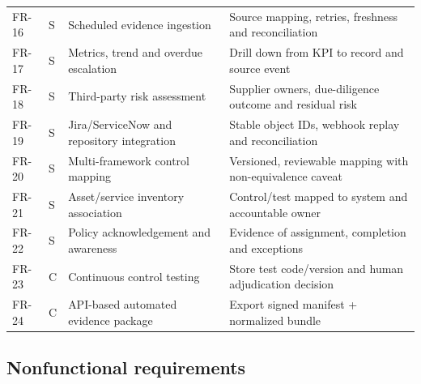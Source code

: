 \documentclass[10pt,letterpaper]{article}
\begin{document}
\begin{longtable}{@{}L{0.58in}L{0.36in}L{2.55in}L{2.87in}@{}}
FR-16 & S & Scheduled evidence ingestion & Source mapping, retries, freshness and reconciliation\\
FR-17 & S & Metrics, trend and overdue escalation & Drill down from KPI to record and source event\\
FR-18 & S & Third-party risk assessment & Supplier owners, due-diligence outcome and residual risk\\
FR-19 & S & Jira/ServiceNow and repository integration & Stable object IDs, webhook replay and reconciliation\\
FR-20 & S & Multi-framework control mapping & Versioned, reviewable mapping with non-equivalence caveat\\
FR-21 & S & Asset/service inventory association & Control/test mapped to system and accountable owner\\
FR-22 & S & Policy acknowledgement and awareness & Evidence of assignment, completion and exceptions\\
FR-23 & C & Continuous control testing & Store test code/version and human adjudication decision\\
FR-24 & C & API-based automated evidence package & Export signed manifest + normalized bundle\\
\bottomrule
\end{longtable}
\normalsize
\subsection{Nonfunctional requirements}
\small
\end{document}
